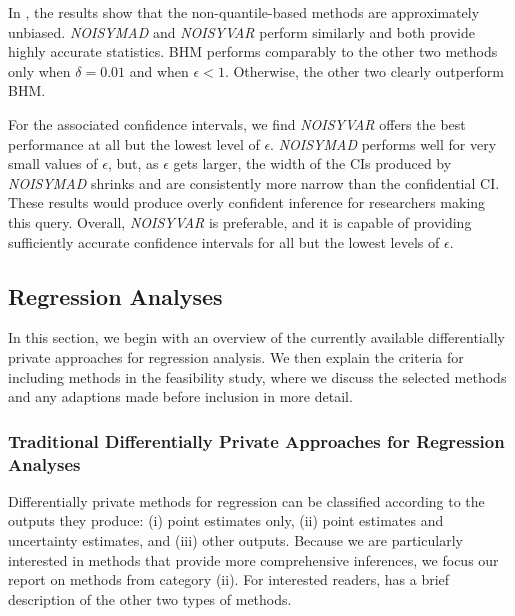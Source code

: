 In \citet{barrientos2021}, the results show that the non-quantile-based methods are approximately unbiased. \textit{NOISYMAD} and \textit{NOISYVAR} perform similarly and both provide highly accurate statistics. BHM performs comparably to the other two methods only when $\delta = 0.01$ and when $\epsilon < 1$. Otherwise, the other two clearly outperform BHM.

For the associated confidence intervals, we find \textit{NOISYVAR} offers the best performance at all but the lowest level of $\epsilon$. \textit{NOISYMAD} performs well for very small values of $\epsilon$, but, as $\epsilon$ gets larger, the width of the CIs produced by \textit{NOISYMAD} shrinks and are consistently more narrow than the confidential CI. These results would produce overly confident inference for researchers making this query. Overall, \textit{NOISYVAR} is preferable, and it is capable of providing sufficiently accurate confidence intervals for all but the lowest levels of $\epsilon$.

\subsection{Regression Analyses}
In this section, we begin with an overview of the currently available differentially private approaches for regression analysis. We then explain the criteria for including methods in the feasibility study, where we discuss the selected methods and any adaptions made before inclusion in more detail.

\subsubsection{Traditional Differentially Private Approaches for Regression Analyses}\label{subsubsec:reg_rev}

Differentially private methods for regression can be classified according to the outputs they produce: (i) point estimates only, (ii) point estimates and uncertainty estimates, and (iii) other outputs. Because we are particularly interested in methods that provide more comprehensive inferences, we focus our report on methods from category (ii). For interested readers, \citet{barrientos2021} has a brief description of the other two types of methods.


